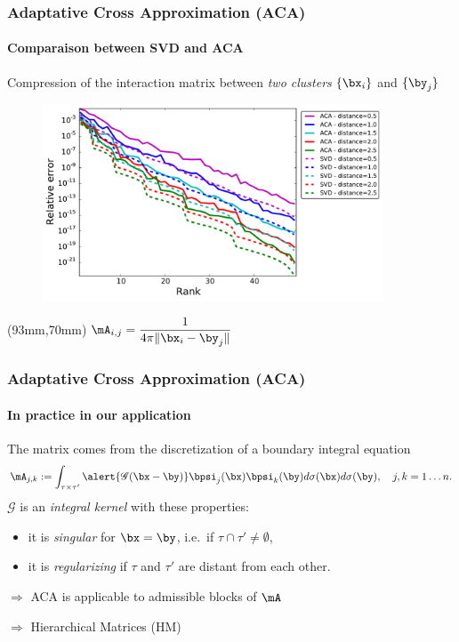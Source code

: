 
\begin{frame}
\frametitle{Adaptative Cross Approximation (ACA)}
\framesubtitle{Comparaison between SVD and ACA} 
Compression of the interaction matrix between \emph{two clusters} $\{ \bx_i\}$ and $\{ \by_j\}$
\begin{figure}
	\centering 
	\includegraphics[width=0.9\textwidth]{../images/graphe_output_err_decrease}
\end{figure}

\begin{textblock*}{50mm}(93mm,70mm)
$\mA_{i,j}=\dfrac{1}{4 \pi \Vert\bx_i - \by_j \Vert }$
\end{textblock*}

\end{frame}


\begin{frame}
\frametitle{Adaptative Cross Approximation (ACA)}
\framesubtitle{In practice in our application} 
The matrix comes from the discretization of a boundary integral equation 
\begin{equation*}\label{GalerkinMatrix}
\mA_{j,k}:= \int_{\tau\times\tau'} \alert{\mathscr{G}(\bx-\by)} \bpsi_{j}(\bx)\bpsi_{k}(\by) d\sigma(\bx) d\sigma(\by),\quad j,k = 1\dots n.
\end{equation*}
\alert{$\mathscr{G}$} is an \emph{integral kernel} with these properties:
\begin{itemize}
\item it is \emph{singular} for $\bx = \by$, i.e.~if $\tau \cap \tau' \ne \emptyset$,
\item it is \emph{regularizing} if $\tau$ and $\tau'$ are \alert{distant} from each other. 
\end{itemize}

\bigskip
 $\Rightarrow$ ACA is applicable to \alert{admissible blocks} of $\mA$
 
 \medskip
 $\Rightarrow$ Hierarchical Matrices (HM)
\end{frame}

